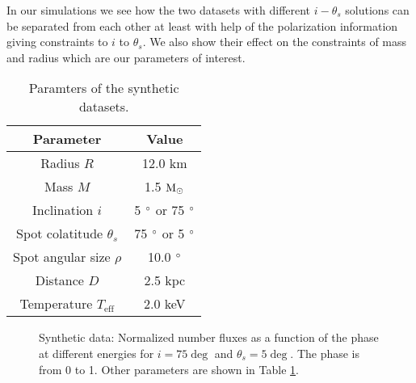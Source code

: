 \documentclass{wihuri}
\def\msun{{\rm M_{\odot}}}
\def\thetas{\theta_{s}}
\begin{document}



In our simulations we see how the two datasets with different $i-\thetas$ solutions can be separated from each other at least with help of the polarization information giving constraints to $i$ to $\thetas$. We also show their effect on the constraints of mass and radius which are our parameters of interest. 




\begin{center}
\begin{table}
  \caption{Paramters of the synthetic datasets.}
\label{table:params}
\begin{center}
  \begin{tabular}{| c | c |}
    \hline
     Parameter & Value\\ \hline
      Radius $R$ & 12.0 km  \\ \hline
      Mass $M$ & 1.5 $\msun$  \\ \hline
      Inclination $i$ & 5 $\degree$ or 75 $\degree$ \\ \hline
      Spot colatitude $\thetas$ & 75 $\degree$ or 5 $\degree$ \\ \hline
      Spot angular size $\rho$ & 10.0 $\degree$  \\ \hline
      Distance $D$ & 2.5 kpc \\ \hline
      Temperature $T_{\mathrm{eff}}$ & 2.0 keV \\

    \hline
  \end{tabular}
  \end{center} 

  \end{table}
\end{center} 



%



\begin{figure}
\centerline{}
\caption{Synthetic data: Normalized number fluxes as a function of the phase at different energies for $i = 75 \deg$ and $\thetas = 5 \deg$. The phase is from 0 to 1. Other parameters are shown in Table \ref{table:params}.
\label{fig:syntpol2}}
\end{figure}
\end{document}
